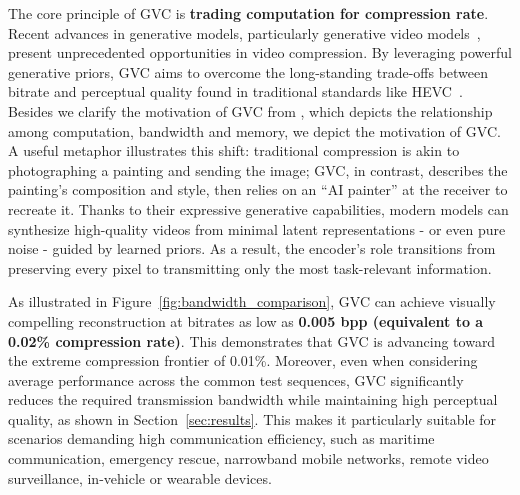 \documentclass{fairmeta}
\begin{document}





The core principle of GVC is \textbf{trading computation for compression rate}. Recent advances in generative models, particularly generative video models~\citep{sora,wan}, present unprecedented opportunities in video compression. By leveraging powerful generative priors, GVC aims to overcome the long-standing trade-offs between bitrate and perceptual quality found in traditional standards like HEVC~\citep{hevc}. Besides we clarify the motivation of GVC from \citep{Fan2025Infra}, which depicts the relationship among computation, bandwidth and memory, we depict the motivation of GVC. A useful metaphor illustrates this shift: traditional compression is akin to photographing a painting and sending the image; GVC, in contrast, describes the painting’s composition and style, then relies on an “AI painter” at the receiver to recreate it. Thanks to their expressive generative capabilities, modern models can synthesize high-quality videos from minimal latent representations - or even pure noise - guided by learned priors. As a result, the encoder’s role transitions from preserving every pixel to transmitting only the most task-relevant information.

As illustrated in Figure~\ref{fig:bandwidth_comparison}, GVC can achieve visually compelling reconstruction at bitrates as low as \textbf{0.005 bpp (equivalent to a 0.02\% compression rate)}. This demonstrates that GVC is advancing toward the extreme compression frontier of 0.01\%. Moreover, even when considering average performance across the common test sequences, GVC significantly reduces the required transmission bandwidth while maintaining high perceptual quality, as shown in Section~\ref{sec:results}. This makes it particularly suitable for scenarios demanding high communication efficiency, such as maritime communication, emergency rescue, narrowband mobile networks, remote video surveillance, in-vehicle or wearable devices. 
\end{document}
